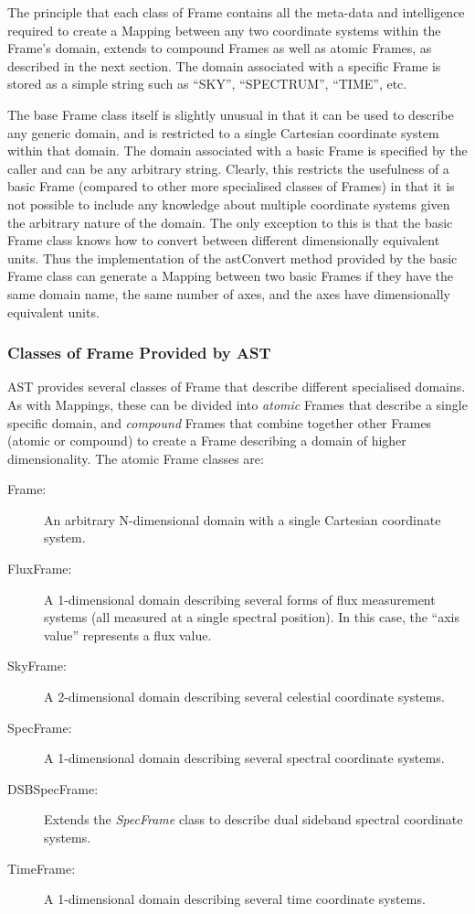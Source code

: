 \documentclass[final,authoryear,5p,times,twocolumn]{elsarticle}
\begin{document}
The principle that each class of Frame contains all the meta-data and
intelligence required to create a Mapping between any two coordinate
systems within the Frame's domain, extends to compound Frames as well as
atomic Frames, as described in the next section. The domain associated
with a specific Frame is stored as a simple string such as ``SKY'',
``SPECTRUM'', ``TIME'', etc.

The base Frame class itself is slightly unusual in that it can be used to
describe any generic domain, and is restricted to a single Cartesian
coordinate system within that domain. The domain associated with a basic
Frame is specified by the caller and can be any arbitrary string. Clearly,
this restricts the usefulness of a basic Frame (compared to other more
specialised classes of Frames) in that it is not possible to include any
knowledge about multiple coordinate systems given the arbitrary nature of
the domain. The only exception to this is that the basic Frame class
knows how to convert between different dimensionally equivalent units.
Thus the implementation of the astConvert method provided by the basic Frame
class can generate a Mapping between two basic Frames if they have the
same domain name, the same number of axes, and the axes have dimensionally
equivalent units.

\subsubsection{Classes of Frame Provided by AST}
AST provides several classes of Frame that describe different specialised
domains. As with Mappings, these can be divided into \emph{atomic} Frames that
describe a single specific domain, and \emph{compound} Frames that combine
together other Frames (atomic or compound) to create a Frame describing a
domain of higher dimensionality. The atomic Frame classes are:

\begin{description}
\item[Frame:] An arbitrary N-dimensional domain with a single Cartesian
coordinate system.
\item[FluxFrame:] A 1-dimensional domain describing several forms of flux
measurement systems (all measured at a single spectral position). In this
case, the ``axis value'' represents a flux value.
\item[SkyFrame:] A 2-dimensional domain describing several celestial
coordinate systems.
\item[SpecFrame:] A 1-dimensional domain describing several spectral
coordinate systems.
\item[DSBSpecFrame:] Extends the \emph{SpecFrame} class to describe dual
sideband spectral coordinate systems.
\item[TimeFrame:] A 1-dimensional domain describing several time coordinate
systems.
\end{description}
\end{document}
